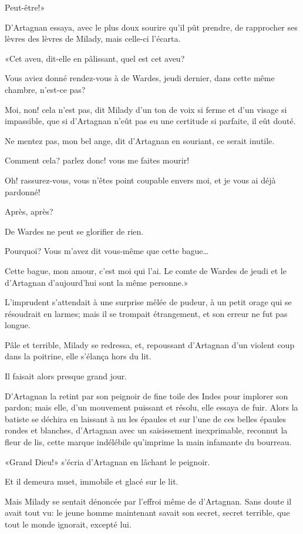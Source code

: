 \speak  Peut-être!» 

D'Artagnan essaya, avec le plus doux sourire qu'il pût prendre, de rapprocher ses lèvres des lèvres de Milady, mais celle-ci l'écarta. 

«Cet aveu, dit-elle en pâlissant, quel est cet aveu? 

\speak  Vous aviez donné rendez-vous à de Wardes, jeudi dernier, dans cette même chambre, n'est-ce pas? 

\speak  Moi, non! cela n'est pas, dit Milady d'un ton de voix si ferme et d'un visage si impassible, que si d'Artagnan n'eût pas eu une certitude si parfaite, il eût douté. 

\speak  Ne mentez pas, mon bel ange, dit d'Artagnan en souriant, ce serait inutile. 

\speak  Comment cela? parlez donc! vous me faites mourir! 

\speak  Oh! rassurez-vous, vous n'êtes point coupable envers moi, et je vous ai déjà pardonné! 

\speak  Après, après? 

\speak  De Wardes ne peut se glorifier de rien. 

\speak  Pourquoi? Vous m'avez dit vous-même que cette bague\dots 

\speak  Cette bague, mon amour, c'est moi qui l'ai. Le comte de Wardes de jeudi et le d'Artagnan d'aujourd'hui sont la même personne.» 

L'imprudent s'attendait à une surprise mêlée de pudeur, à un petit orage qui se résoudrait en larmes; mais il se trompait étrangement, et son erreur ne fut pas longue. 

Pâle et terrible, Milady se redressa, et, repoussant d'Artagnan d'un violent coup dans la poitrine, elle s'élança hors du lit. 

Il faisait alors presque grand jour. 

D'Artagnan la retint par son peignoir de fine toile des Indes pour implorer son pardon; mais elle, d'un mouvement puissant et résolu, elle essaya de fuir. Alors la batiste se déchira en laissant à nu les épaules et sur l'une de ces belles épaules rondes et blanches, d'Artagnan avec un saisissement inexprimable, reconnut la fleur de lis, cette marque indélébile qu'imprime la main infamante du bourreau. 

«Grand Dieu!» s'écria d'Artagnan en lâchant le peignoir. 

Et il demeura muet, immobile et glacé sur le lit. 

Mais Milady se sentait dénoncée par l'effroi même de d'Artagnan. Sans doute il avait tout vu: le jeune homme maintenant savait son secret, secret terrible, que tout le monde ignorait, excepté lui. 

